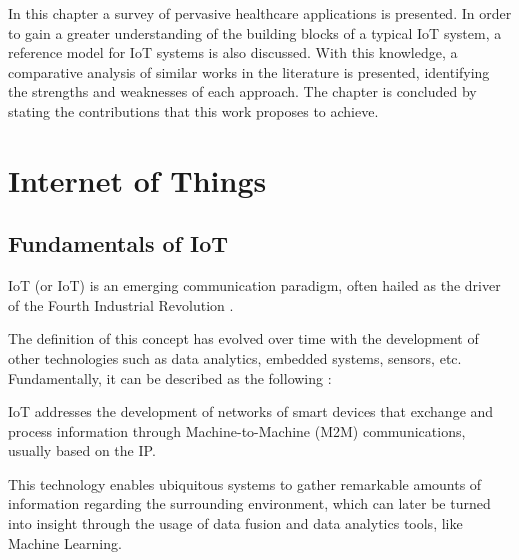 In this chapter a survey of pervasive healthcare applications is presented. In order to gain a greater understanding of the building blocks of a typical \acf{IoT} system, a reference model for \acs{IoT} systems is also discussed. With this knowledge, a comparative analysis of similar works in the literature is presented, identifying the strengths and weaknesses of each approach. The chapter is concluded by stating the contributions that this work proposes to achieve.

\section{Internet of Things}

\subsection{Fundamentals of \acs{IoT}}


\acl{IoT} (or \acs{IoT}) is an emerging communication paradigm, often hailed as the driver of the Fourth Industrial Revolution \cite{Aceto2020}. \bigskip

The definition of this concept has evolved over time with the development of other technologies such as data analytics, embedded systems, sensors, etc. Fundamentally, it can be described as the following \cite{Baker2017}: \bigskip

\begin{tcolorbox}[colback=blue!5!white,colframe=blue!75!black]
    \acs{IoT} addresses the development of networks of smart devices that exchange and process information through Machine-to-Machine (M2M) communications, usually based on the \acf{IP}.
\end{tcolorbox}

This technology enables ubiquitous systems to gather remarkable amounts of information regarding the surrounding environment, which can later be turned into insight through the usage of data fusion and data analytics tools, like Machine Learning. \bigskip

